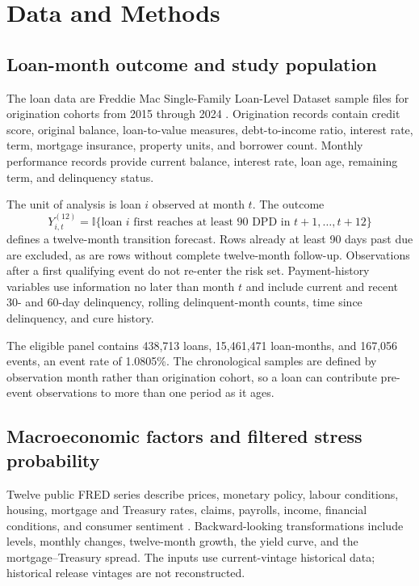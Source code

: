 \documentclass[12pt]{article}
\begin{document}
\section{Data and Methods}

\subsection{Loan-month outcome and study population}

The loan data are Freddie Mac Single-Family Loan-Level Dataset sample files for origination cohorts from 2015 through 2024 \citep{freddie_data}. Origination records contain credit score, original balance, loan-to-value measures, debt-to-income ratio, interest rate, term, mortgage insurance, property units, and borrower count. Monthly performance records provide current balance, interest rate, loan age, remaining term, and delinquency status.

The unit of analysis is loan $i$ observed at month $t$. The outcome
\begin{equation}
Y_{i,t}^{(12)}=\mathbb{I}\{\text{loan }i\text{ first reaches at least 90 DPD in }t+1,\ldots,t+12\}
\end{equation}
defines a twelve-month transition forecast. Rows already at least 90 days past due are excluded, as are rows without complete twelve-month follow-up. Observations after a first qualifying event do not re-enter the risk set. Payment-history variables use information no later than month $t$ and include current and recent 30- and 60-day delinquency, rolling delinquent-month counts, time since delinquency, and cure history.

The eligible panel contains 438,713 loans, 15,461,471 loan-months, and 167,056 events, an event rate of 1.0805\%. The chronological samples are defined by observation month rather than origination cohort, so a loan can contribute pre-event observations to more than one period as it ages.

\subsection{Macroeconomic factors and filtered stress probability}

Twelve public FRED series describe prices, monetary policy, labour conditions, housing, mortgage and Treasury rates, claims, payrolls, income, financial conditions, and consumer sentiment \citep{fred_data}. Backward-looking transformations include levels, monthly changes, twelve-month growth, the yield curve, and the mortgage--Treasury spread. The inputs use current-vintage historical data; historical release vintages are not reconstructed.
\end{document}
